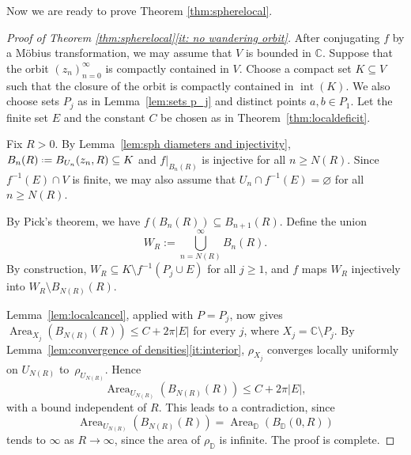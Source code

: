 \documentclass[12pt,a4paper,reqno]{amsart}
\newcommand{\Area}{\operatorname{Area}}
\theoremstyle{plain}
\renewcommand{\subset}{\subseteq}
\theoremstyle{definition}
\theoremstyle{remark}
\newcommand{\interior}{\operatorname{int}}
\newcommand{\DD}{\mathbb{D}}
\numberwithin{equation}{section}
\newcommand \C{\mathbb{C}}
\newcommand*{\defeq}{\mathrel{\vcenter{\baselineskip0.5ex \lineskiplimit0pt
                     \hbox{\scriptsize.}\hbox{\scriptsize.}}}%
                     =}
\begin{document}
Now we are ready to prove Theorem \ref{thm:spherelocal}.

\begin{proof}[Proof of Theorem \ref{thm:spherelocal}\ref{it: no wandering orbit}]

After conjugating $f$ by a M\"obius transformation, we may assume that $V$ is bounded in $\C$. Suppose that the orbit $(z_n)_{n=0}^{\infty}$ is compactly contained in $V$. Choose a compact set $K \subset V$ such that the closure of 
the orbit is compactly contained in $\interior(K)$. We also choose sets $P_j$ as in Lemma~\ref{lem:sets p_j} and distinct points $a,b \in P_1$. Let the finite set $E$ and the constant $C$ be chosen as in Theorem~\ref{thm:localdeficit}.

Fix $R > 0$. By Lemma~\ref{lem:sph diameters and injectivity}, $B_n(R) \defeq B_{U_n}(z_n,R) \subset K$ and $f|_{B_n(R)}$ is injective for all $n \geq N(R)$. Since $f^{-1}(E) \cap V$ is finite, we may also assume that $U_n \cap f^{-1}(E) = \varnothing$ for all $n \geq N(R)$.

By Pick's theorem, we have $f(B_n(R)) \subset B_{n+1}(R)$. Define the union 
\[W_R := \bigcup_{n=N(R)}^\infty B_n(R).\] By
construction, $W_R \subset K \setminus f^{-1}(P_j \cup E)$ for all $j \geq 1$, and $f$ maps $W_R$ injectively into $W_R \setminus B_{N(R)}(R)$.

Lemma~\ref{lem:localcancel}, applied with $P = P_j$, now gives $\Area_{X_j}(B_{N(R)}(R)) \leq C + 2\pi|E|$ for every $j$, where $X_j = \C \setminus P_j$. By Lemma~\ref{lem:convergence of densities}\eqref{it:interior}, $\rho_{X_j}$ converges locally uniformly on $U_{N(R)}$ to~$\rho_{U_{N(R)}}$. Hence
$$
    \Area_{U_{N(R)}}(B_{N(R)}(R)) \leq C + 2\pi|E|,
$$
with a bound independent of $R$. This leads to a contradiction, since
$$
    \Area_{U_{N(R)}}(B_{N(R)}(R)) = 
    \Area_{\DD}(B_{\DD}(0,R))
$$
tends to $\infty$ as $R \to \infty$, since the
area of $\rho_{\DD}$ is infinite. The proof is complete.
\end{proof}
\end{document}
